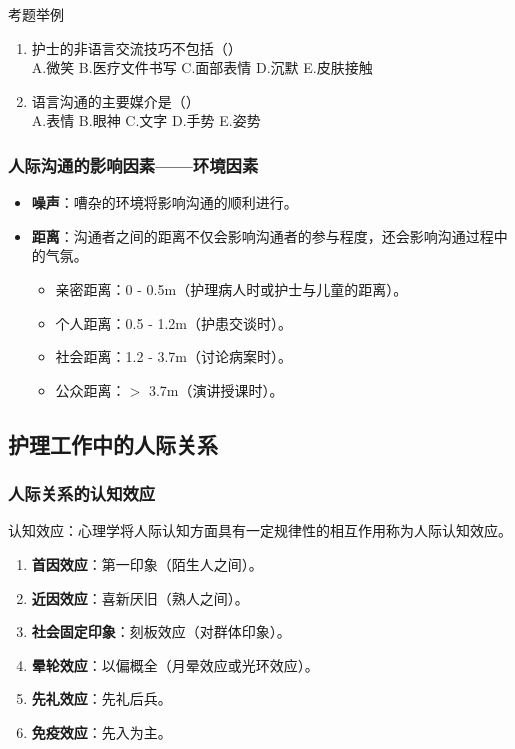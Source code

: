 \documentclass[11pt, a4paper]{ctexart}
\begin{document}
\begin{examplebox}{考题举例}
	\begin{enumerate}
		\item 护士的非语言交流技巧不包括（\qquad）\\
		      A.微笑 \quad B.医疗文件书写 \quad C.面部表情 \quad D.沉默 \quad E.皮肤接触
		\item 语言沟通的主要媒介是（\qquad）\\
		      A.表情 \quad B.眼神 \quad C.文字 \quad D.手势 \quad E.姿势
	\end{enumerate}
\end{examplebox}

\subsubsection{人际沟通的影响因素——环境因素}
\begin{itemize}
	\item \textbf{噪声}：嘈杂的环境将影响沟通的顺利进行。
	\item \textbf{距离}：沟通者之间的距离不仅会影响沟通者的参与程度，还会影响沟通过程中的气氛。
	      \begin{itemize}
		      \item 亲密距离：0 - 0.5m（护理病人时或护士与儿童的距离）。
		      \item 个人距离：0.5 - 1.2m（护患交谈时）。
		      \item 社会距离：1.2 - 3.7m（讨论病案时）。
		      \item 公众距离：$>$ 3.7m（演讲授课时）。
	      \end{itemize}
\end{itemize}

\subsection{护理工作中的人际关系}
\subsubsection{人际关系的认知效应}
认知效应：心理学将人际认知方面具有一定规律性的相互作用称为人际认知效应。
\begin{enumerate}
	\item \textbf{首因效应}：第一印象（陌生人之间）。
	\item \textbf{近因效应}：喜新厌旧（熟人之间）。
	\item \textbf{社会固定印象}：刻板效应（对群体印象）。
	\item \textbf{晕轮效应}：以偏概全（月晕效应或光环效应）。
	\item \textbf{先礼效应}：先礼后兵。
	\item \textbf{免疫效应}：先入为主。
\end{enumerate}
\end{document}
